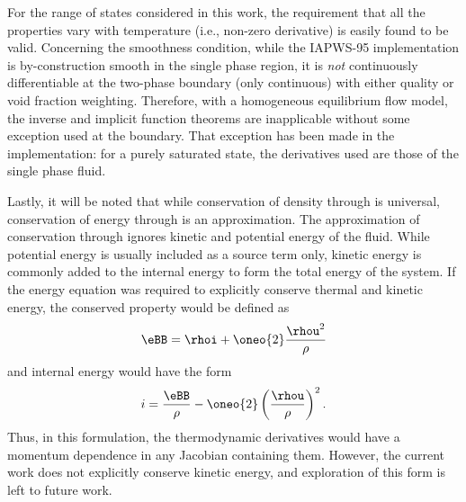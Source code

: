 For the range of states considered in this work, the requirement that all the properties vary with temperature (i.e., non-zero derivative) is easily found to be valid.
Concerning the smoothness condition, while the IAPWS-95 implementation is by-construction smooth in the single phase region, it is \emph{not} continuously differentiable at the two-phase boundary (only continuous) with either quality or void fraction weighting.  
Therefore, with a homogeneous equilibrium flow model, the inverse and implicit function theorems are inapplicable without some exception used at the boundary.
That exception has been made in the implementation: for a purely saturated state, the derivatives used are those of the single phase fluid.

Lastly, it will be noted that while conservation of density through \rho is universal, conservation of energy through \rhoi is an approximation.
The approximation of conservation through \rhoi ignores kinetic and potential energy of the fluid.
While potential energy is usually included as a source term only, kinetic energy is commonly added to the internal energy to form the total energy of the system.
If the energy equation was required to explicitly conserve thermal and kinetic energy, the conserved property would be defined as 
\begin{equation}
    \eBB = \rhoi + \oneo{2} \frac{\rhou^2}{\rho}
\end{equation}
and internal energy would have the form
\begin{equation}
    i = \frac{\eBB}{\rho} - \oneo{2}\left(\frac{\rhou}{\rho}\right)^2.
\end{equation}
Thus, in this formulation, the thermodynamic derivatives would have a momentum dependence in any Jacobian containing them.
However, the current work does not explicitly conserve kinetic energy, and exploration of this form is left to future work.

